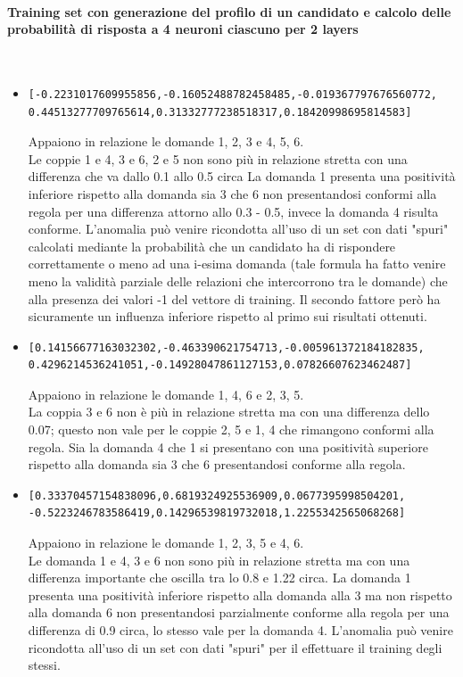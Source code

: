 \paragraph{Training set con generazione del profilo di un candidato e calcolo delle probabilit\`a di risposta a 4 neuroni ciascuno per 2 layers}\mbox{}
\label{Training set con generazione del profilo di un candidato e calcolo delle probabilita di risposta a 4 neuroni}
\\
\noindent
\begin{itemize}
\item  \begin{verbatim}[-0.2231017609955856,-0.16052488782458485,-0.019367797676560772,
0.44513277709765614,0.31332777238518317,0.18420998695814583]
\end{verbatim}
Appaiono in relazione le domande 1, 2, 3 e 4, 5, 6.\\
Le coppie 1 e 4, 3 e 6, 2 e 5 non sono pi\`u in relazione stretta con una differenza che va dallo 0.1 allo 0.5 circa La domanda 1 presenta una positivit\`a inferiore rispetto alla domanda sia 3 che 6 non presentandosi conformi alla regola per una differenza attorno allo 0.3 - 0.5, invece la domanda 4 risulta conforme. L'anomalia pu\`o venire ricondotta all'uso di un set con dati "spuri" calcolati mediante la probabilit\`a che un candidato ha di rispondere correttamente o meno ad una i-esima domanda (tale formula ha fatto venire meno la validit\`a parziale delle relazioni che intercorrono tra le domande) che alla presenza dei valori -1 del vettore di training. Il secondo fattore per\`o ha sicuramente un influenza inferiore rispetto al primo sui risultati ottenuti.

\item \begin{verbatim}[0.14156677163032302,-0.463390621754713,-0.005961372184182835,
0.4296214536241051,-0.14928047861127153,0.07826607623462487]
\end{verbatim}
Appaiono in relazione le domande 1, 4, 6 e 2, 3, 5.\\
La coppia 3 e 6 non \`e pi\`u in relazione stretta ma con una differenza dello 0.07; questo non vale per le coppie 2, 5 e 1, 4 che rimangono conformi alla regola. Sia la domanda 4 che 1 si presentano con una positivit\`a superiore rispetto alla domanda sia 3 che 6 presentandosi conforme alla regola.

\item  \begin{verbatim}[0.33370457154838096,0.6819324925536909,0.0677395998504201,
-0.5223246783586419,0.14296539819732018,1.2255342565068268]
\end{verbatim}
Appaiono in relazione le domande 1, 2, 3, 5 e  4, 6.\\
Le domanda 1 e 4, 3 e 6 non sono pi\`u in relazione stretta ma con una differenza importante che oscilla tra lo 0.8 e 1.22 circa. La domanda 1 presenta una positivit\`a inferiore rispetto alla domanda alla 3 ma non rispetto alla domanda 6 non presentandosi parzialmente conforme alla regola per una differenza di 0.9 circa, lo stesso vale per la domanda 4. L'anomalia pu\`o venire ricondotta all'uso di un set con dati "spuri" per il effettuare il training degli stessi.


\end{itemize}
